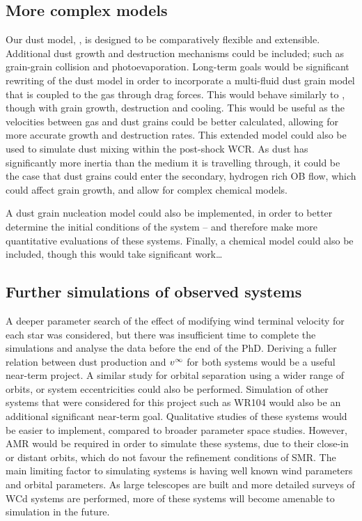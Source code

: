 \subsection{More complex models}

Our dust model, \bidmas{}, is designed to be comparatively flexible and extensible.
Additional dust growth and destruction mechanisms could be included; such as grain-grain collision and photoevaporation.
Long-term goals would be significant rewriting of the dust model in order to incorporate a multi-fluid dust grain model that is coupled to the gas through drag forces.
This would behave similarly to \textcite{hendrix_pinwheels_2016}, though with grain growth, destruction and cooling.
This would be useful as the velocities between gas and dust grains could be better calculated, allowing for more accurate growth and destruction rates.
This extended model could also be used to simulate dust mixing within the post-shock WCR.
As dust has significantly more inertia than the medium it is travelling through, it could be the case that dust grains could enter the secondary, hydrogen rich OB flow, which could affect grain growth, and allow for complex chemical models. 

A dust grain nucleation model could also be implemented, in order to better determine the initial conditions of the system -- and therefore make more quantitative evaluations of these systems.
Finally, a chemical model could also be included, though this would take significant work\ldots

\subsection{Further simulations of observed systems}

A deeper parameter search of the effect of modifying wind terminal velocity for each star was considered, but there was insufficient time to complete the simulations and analyse the data before the end of the PhD.
Deriving a fuller relation between dust production and $v^\infty$ for both systems would be a useful near-term project.
A similar study for orbital separation using a wider range of orbits, or system eccentricities could also be performed.
Simulation of other systems that were considered for this project such as WR104 would also be an additional significant near-term goal.
Qualitative studies of these systems would be easier to implement, compared to broader parameter space studies.
However, AMR would be required in order to simulate these systems, due to their close-in or distant orbits, which do not favour the refinement conditions of SMR.
The main limiting factor to simulating systems is having well known wind parameters and orbital parameters.
As large telescopes are built and more detailed surveys of WCd systems are performed, more of these systems will become amenable to simulation in the future.

